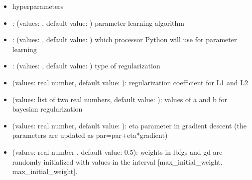 \documentclass[letterpaper,10pt,english]{sphinxmanual}
\begin{document}
\begin{sphinxVerbatim}[commandchars=\\\{\}]
 
\end{sphinxVerbatim}
\begin{itemize}
\item {} 
\sphinxAtStartPar
hyper\sphinxhyphen{}parameters

\end{itemize}
\begin{itemize}
\item {} 
\sphinxAtStartPar
{}: (values: , default value: ) parameter learning algorithm

\item {} 
\sphinxAtStartPar
{}: (values: , default value: ) which processor Python will use for parameter learning

\item {} 
\sphinxAtStartPar
{}: (values: , default value: ) type of regularization

\item {} 
\sphinxAtStartPar
{} (values: real number, default value: ): regularization coefficient for L1 and L2

\item {} 
\sphinxAtStartPar
{} (values: list of two real numbers, default value: \sphinxcode{\sphinxupquote{{[}0,10{]}}}): values of a and b for bayesian regularization

\item {} 
\sphinxAtStartPar
{} (values: real number, default value: ): eta parameter in gradient descent (the parameters are updated as par=par+eta*gradient)

\item {} 
\sphinxAtStartPar
{} (values: real number , default value: 0.5): weights in lbfgs and gd are randomly initialized with values in the interval {[}\sphinxhyphen{}max\_initial\_weight, max\_initial\_weight{]}.


\end{itemize}
\end{document}
